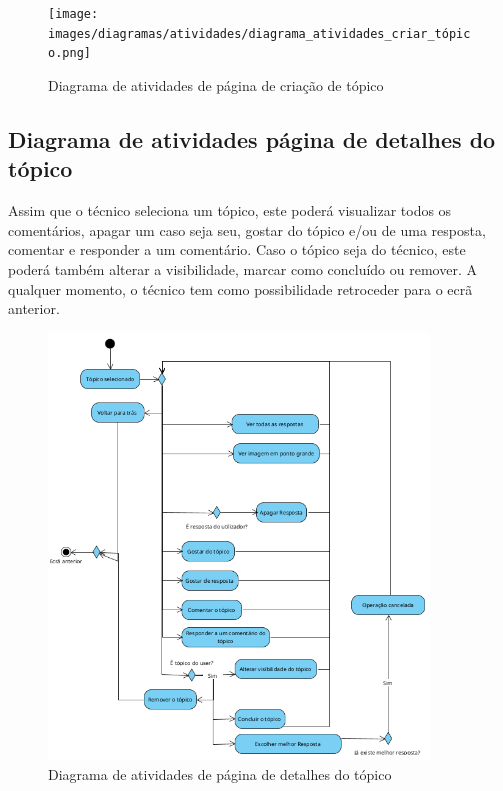 \begin{figure}[htb]
  \centering
  \texttt{[image: images/diagramas/atividades/diagrama\_atividades\_criar\_tópico.png]}
  \caption{Diagrama de atividades de página de criação de tópico}
  \label{fig:37}
\end{figure}

\newpage

\subsection{Diagrama de atividades página de detalhes do tópico}

Assim que o técnico seleciona um tópico, este poderá visualizar todos os comentários, apagar um caso seja seu, gostar do tópico e/ou de uma resposta, comentar e responder a um comentário. Caso o tópico seja do técnico, este poderá também alterar a visibilidade, marcar como concluído ou remover. A qualquer momento, o técnico tem como possibilidade retroceder para o ecrã anterior.

\begin{figure}[htb]
  \centering
  \includegraphics[width=0.9\textwidth]{images/diagramas/atividades/diagrama_atividades_detalhes_topico.png}
  \caption{Diagrama de atividades de página de detalhes do tópico}
  \label{fig:38}
\end{figure}

